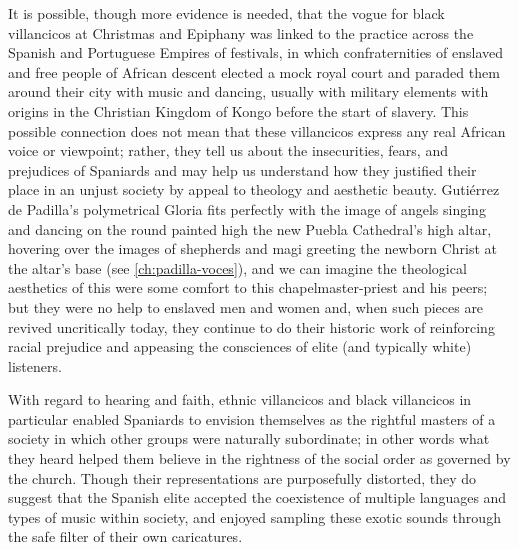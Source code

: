 It is possible, though more evidence is needed, that the vogue for black
villancicos at Christmas and Epiphany was linked to the practice across the
Spanish and Portuguese Empires of  festivals, in which
confraternities of enslaved and free people of African descent elected a mock
royal court and paraded them around their city with music and dancing, usually
with military elements with origins in the Christian Kingdom of Kongo before
the start of slavery.%
    \citXXX[sources]
This possible connection does not mean that these villancicos express any real
African voice or viewpoint; rather, they tell us about the insecurities, fears,
and prejudices of Spaniards and may help us understand how they justified their
place in an unjust society by appeal to theology and aesthetic beauty.
Gutiérrez de Padilla's polymetrical Gloria fits perfectly with the image of
angels singing and dancing on the round painted high the new Puebla
Cathedral's high altar, hovering over the images of shepherds and magi greeting
the newborn Christ at the altar's base (see \cref{ch:padilla-voces}), and we
can imagine the theological aesthetics of this were some comfort to this
chapelmaster-priest and his peers; but they were no help to enslaved men and
women and, when such pieces are revived uncritically today, they continue to do
their historic work of reinforcing racial prejudice and appeasing the
consciences of elite (and typically white) listeners.

With regard to hearing and faith, ethnic villancicos and black villancicos in
particular enabled Spaniards to envision themselves as the rightful masters of
a society in which other groups were naturally subordinate; in other words what
they heard helped them believe in the rightness of the social order as governed
by the church. %
Though their representations are purposefully distorted, they do suggest that
the Spanish elite accepted the coexistence of multiple languages and types of
music within society, and enjoyed sampling these exotic sounds through the safe
filter of their own caricatures.


